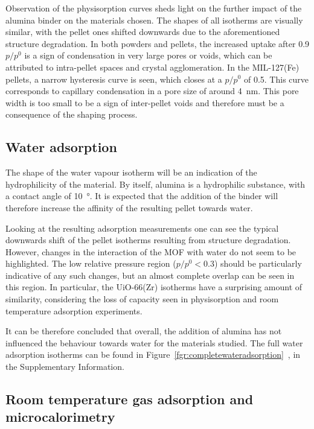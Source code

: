 Observation of the physisorption curves sheds light on the further impact of the 
alumina binder on the materials chosen.
The shapes of all isotherms are visually similar, with the pellet ones shifted
downwards due to the aforementioned structure degradation.
In both powders and pellets, the increased uptake after 0.9 \(p/p^0\) is a sign
of condensation in very large pores or voids, which can be attributed to intra-pellet
spaces and crystal agglomeration.
In the MIL-127(Fe) pellets, a narrow hysteresis curve is seen, which closes at a 
\(p/p^0\) of 0.5. This curve corresponds to capillary condensation in a pore size
of around \SI{4}{\nano\metre}. This pore width is too small to be a sign of 
inter-pellet voids and therefore must be a consequence of the shaping process.

\subsection{Water adsorption}

The shape of the water vapour isotherm will be an indication of the hydrophilicity
of the material. By itself, alumina is a hydrophilic substance, with a contact 
angle of \SI{10}{\degree}. It is expected that the addition of the binder will
therefore increase the affinity of the resulting pellet towards water.

Looking at the resulting adsorption measurements one can see the typical downwards
shift of the pellet isotherms resulting from structure degradation. However, changes
in the interaction of the MOF with water do not seem to be highlighted. The low relative
pressure region (\(p/p^0 < 0.3\)) should be particularly indicative of any such 
changes, but an almost complete overlap can be seen in this region.
In particular, the UiO-66(Zr) isotherms have a surprising amount of similarity,
considering the loss of capacity seen in  physisorption and room temperature 
adsorption experiments.

It can be therefore concluded that overall, the addition of alumina has not influenced 
the behaviour towards water for the materials studied. The full water adsorption isotherms
can be found in Figure~\ref*{fgr:completewateradsorption}~, in the Supplementary Information.

\subsection{Room temperature gas adsorption and microcalorimetry}

